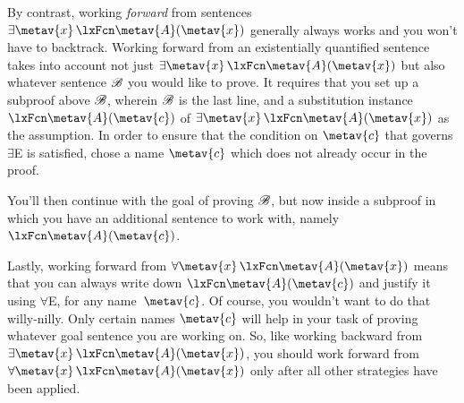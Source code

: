 By contrast, working \emph{forward} from sentences $\exists \metav{x}\, \atom{\metav{A}}{\metav{x}}$ generally always works and you won't have to backtrack. Working forward from an existentially quantified sentence takes into account not just $\exists \metav{x}\, \atom{\metav{A}}{\metav{x}}$ but also whatever sentence $\mathscr{B}$ you would like to prove. It requires that you set up a subproof above $\mathscr{B}$, wherein $\mathscr{B}$ is the last line, and a substitution instance $\atom{\metav{A}}{\metav{c}}$ of $\exists \metav{x}\, \atom{\metav{A}}{\metav{x}}$ as the assumption.  In order to ensure that the condition on $\metav{c}$ that governs $\exists$E is satisfied, chose a name $\metav{c}$ which does not already occur in the proof.
\begin{fitchproof}
	\ellipsesline
	\ellipsesline
	\open
	\AS
	\ellipsesline
	\close
\end{fitchproof}
You'll then continue with the goal of proving $\mathscr{B}$, but now inside a subproof in which you have an additional sentence to work with, namely~$\atom{\metav{A}}{\metav{c}}$.

Lastly, working forward from $\forall \metav{x}\, \atom{\metav{A}}{\metav{x}}$ means that you can always write down $\atom{\metav{A}}{\metav{c}}$ and justify it using $\forall$E, for any name~$\metav{c}$. Of course, you wouldn't want to do that willy-nilly. Only certain names $\metav{c}$ will help in your task of proving whatever goal sentence you are working on. So, like working backward from $\exists \metav{x}\, \atom{\metav{A}}{\metav{x}}$, you should work forward from $\forall \metav{x}\, \atom{\metav{A}}{\metav{x}}$ only after all other strategies have been applied.

